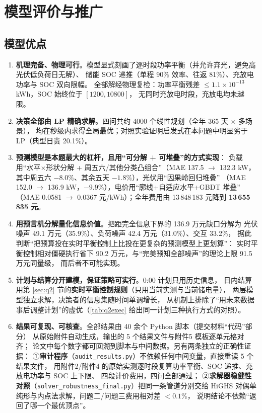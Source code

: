 \section{模型评价与推广}

\subsection{模型优点}

\begin{enumerate}[label=(\arabic*), leftmargin=2.2em, itemsep=2pt]
\item \textbf{机理完备、物理可行}。模型显式刻画了逐时段功率平衡（并允许弃光，避免高光伏低负荷日无解）、
储能 SOC 递推（单程 90\% 效率、往返 81\%）、充放电功率与 SOC 双向限幅。
全部解经物理复检：功率平衡残差 $\le1.1\times10^{-13}$ kWh，SOC 始终位于 $[1200,10800]$，
无同时充放电时段，充放电均未越限。
\item \textbf{决策全部由 LP 精确求解}。四问共约 4000 个线性规划（全年 365 天 $\times$ 多场景），
均在秒级内求得全局最优；对照实验证明启发式在本问题中明显劣于 LP（典型日贵 20.1\%）。
\item \textbf{预测模型是本题最大的杠杆，且用“可分解 + 可堆叠”的方式实现}：
负载用“水平$\times$形状分解 + 周五六/其他分类凸组合”（MAE 137.5 $\to$ 132.3 kW，
其中周五六 $-8.0\%$、其余五天 $-1.8\%$），光伏用“因果岭回归堆叠”
（MAE 152.0 $\to$ 136.9 kW，$-9.9\%$），电价用“廓线+自适应水平+GBDT 堆叠”
（MAE 0.0581 $\to$ 0.0367 元/kWh）；全年费用由 13\,848\,183 元降到 \textbf{13\,655\,835 元}。
\item \textbf{用预言机分解量化信息价值}。把距完全信息下界的 136.9 万元缺口分解为
光伏噪声 49.1 万元（35.9\%）、负荷噪声 42.4 万元（31.0\%）、交互 33.2\%，
据此判断“把预算投在实时平衡控制上比投在更复杂的预测模型上更划算”：
实时平衡控制相对僵硬执行省下 90.2 万元，与“完美预知全部噪声”的理论上限 91.5 万元同量级，
而后者不可能实现。
\item \textbf{计划与结算分开建模，保证策略可实行}。0:00 计划只用历史信息，
日内结算用第 \ref{sec:q2} 节的\textbf{实时平衡控制规则}（只用当前实测与当前储电量），
两层模型独立求解，决策者的信息集随时间单调增长，
从机制上排除了“用未来数据事后调整计划”的虚优（\cref{tab:q2exec} 给出同一计划三种执行方式的对照）。
\item \textbf{结果可复现、可核查}。全部结果由 40 余个 Python 脚本（提交材料“代码”部分）
从原始附件自动生成，输出的 5 个结果文件与附件5 模板逐单元格对齐；
论文中每个数字都可回溯到脚本与中间数据。另有两条独立的正确性证据：
①\textbf{审计程序}（\texttt{audit\_results.py}）不依赖任何中间变量，直接重读 5 个结果文件，
用附件2/附件4 的原始实测逐时段复算功率平衡、SOC 递推、充放电功率与 SOC 上下限、
四段计价费用，四问全部通过；
②\textbf{求解器稳健性对照}（\texttt{solver\_robustness\_final.py}）把同一条管道分别交给
HiGHS 对偶单纯形与内点法求解，问题二/问题三费用相对差 $<0.1\%$，
说明结论不依赖“返回了哪一个最优顶点”。
\end{enumerate}

